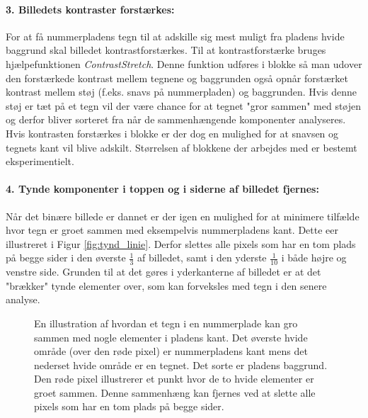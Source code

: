 \paragraph{3. Billedets kontraster forstærkes:}
For at få nummerpladens tegn til at adskille sig mest muligt fra pladens hvide baggrund skal billedet kontrastforstærkes. Til at kontrastforstærke bruges hjælpefunktionen \textit{ContrastStretch}. Denne funktion udføres i blokke så man udover den forstærkede kontrast mellem tegnene og baggrunden også opnår forstærket kontrast mellem støj (f.eks. snavs på nummerpladen) og baggrunden. Hvis denne støj er tæt på et tegn vil der være chance for at tegnet "gror sammen" med støjen og derfor bliver sorteret fra når de sammenhængende komponenter analyseres. Hvis kontrasten forstærkes i blokke er der dog en mulighed for at snavsen og tegnets kant vil blive adskilt. Størrelsen af blokkene der arbejdes med er bestemt eksperimentielt.

\paragraph{4. Tynde komponenter i toppen og i siderne af billedet fjernes:}
Når det binære billede er dannet er der igen en mulighed for at minimere tilfælde hvor tegn er groet sammen med eksempelvis nummerpladens kant. Dette eer illustreret i Figur \vref{fig:tynd_linie}. Derfor slettes alle pixels som har en tom plads på begge sider i den øverste $\frac{1}{3}$ af billedet, samt i den yderste $\frac{1}{10}$ i både højre og venstre side. Grunden til at det gøres i yderkanterne af billedet er at det "brækker" tynde elementer over, som kan forveksles med tegn i den senere analyse.


\begin{figure}[htp]
\centering
{} 
\caption{En illustration af hvordan et tegn i en nummerplade kan gro sammen med nogle elementer i pladens kant. Det øverste hvide område (over den røde pixel) er nummerpladens kant mens det nederset hvide område er en tegnet. Det sorte er pladens baggrund. Den røde pixel illustrerer et punkt hvor de to hvide elementer er groet sammen. Denne sammenhæng kan fjernes ved at slette alle pixels som har en tom plads på begge sider.}
\label{fig:tynd_linie}
\end{figure}

